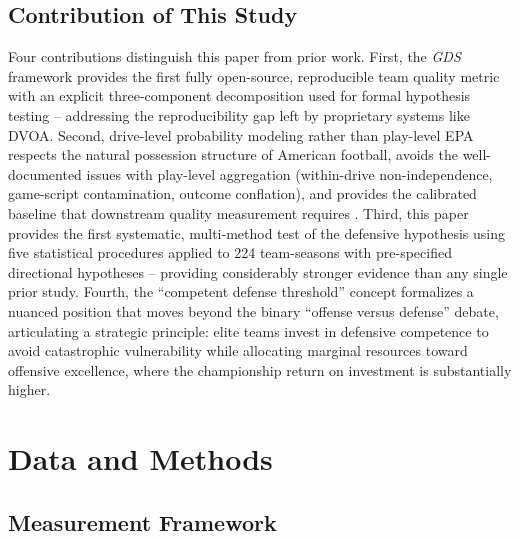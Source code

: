 \documentclass[12pt,a4paper]{article}
\newcommand{\gds}{\textit{GDS}}
\begin{document}
\subsection{Contribution of This Study}
\label{sec:contribution}

Four contributions distinguish this paper from prior work. First, the \gds{} framework provides the first fully open-source, reproducible team quality metric with an explicit three-component decomposition used for formal hypothesis testing -- addressing the reproducibility gap left by proprietary systems like DVOA. Second, drive-level probability modeling rather than play-level EPA respects the natural possession structure of American football, avoids the well-documented issues with play-level aggregation (within-drive non-independence, game-script contamination, outcome conflation), and provides the calibrated baseline that downstream quality measurement requires \citep{mecha2026xscore-model}. Third, this paper provides the first systematic, multi-method test of the defensive hypothesis using five statistical procedures applied to 224 team-seasons with pre-specified directional hypotheses -- providing considerably stronger evidence than any single prior study. Fourth, the ``competent defense threshold'' concept formalizes a nuanced position that moves beyond the binary ``offense versus defense'' debate, articulating a strategic principle: elite teams invest in defensive competence to avoid catastrophic vulnerability while allocating marginal resources toward offensive excellence, where the championship return on investment is substantially higher.

\section{Data and Methods}
\label{sec:methods}

\subsection{Measurement Framework}
\label{sec:measurement}
\end{document}
